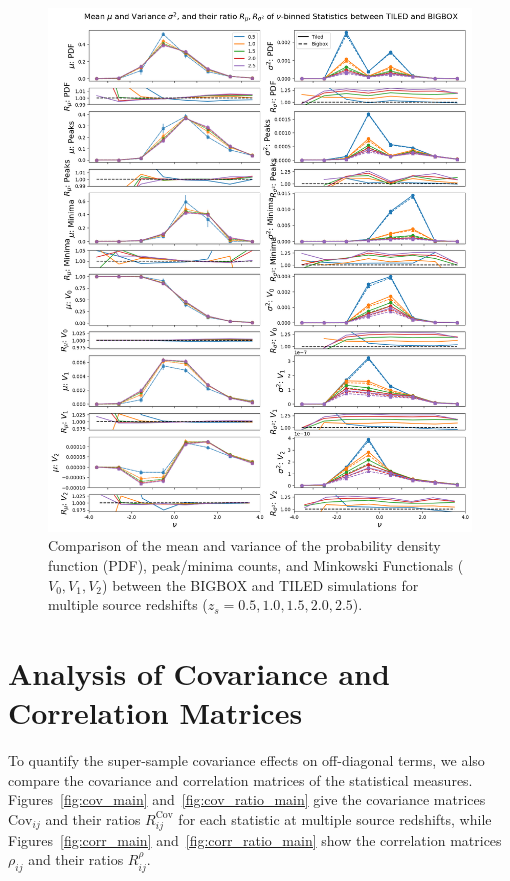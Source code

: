 \begin{figure}[p]
    \centering
    \includegraphics[width=\textwidth]{figures/results/nu_main.png}
    \caption[Comparison of the mean and variance of Non-Correlation Statistics]{Comparison of the mean and variance of the probability density function (PDF), peak/minima counts, and Minkowski Functionals ($V_0, V_1, V_2$) between the BIGBOX and TILED simulations for multiple source redshifts ($z_s = 0.5, 1.0, 1.5, 2.0, 2.5$).}
    \label{fig:nu_main}
\end{figure}

\section{Analysis of Covariance and Correlation Matrices}
To quantify the super-sample covariance effects on off-diagonal terms, we also compare the covariance and correlation matrices of the statistical measures. Figures~\ref{fig:cov_main} and~\ref{fig:cov_ratio_main} give the covariance matrices $\text{Cov}_{ij}$ and their ratios $R^{\text{Cov}}_{ij}$ for each statistic at multiple source redshifts, while Figures~\ref{fig:corr_main} and~\ref{fig:corr_ratio_main} show the correlation matrices $\rho_{ij}$ and their ratios $R^{\rho}_{ij}$.

